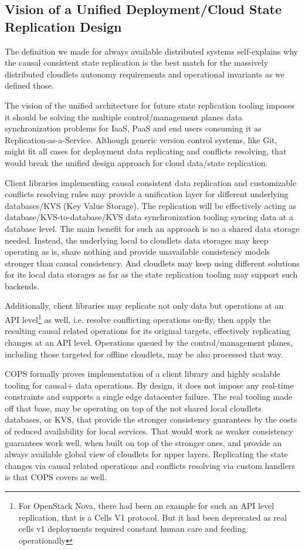 \documentclass[conference]{IEEEtran}
\begin{document}
\subsection{Vision of a Unified Deployment/Cloud State Replication Design}

The definition we made for always available distributed systems self-explains
why the causal consistent state replication is the best match for the
massively distributed cloudlets autonomy requirements and operational
invariants as we defined those.

The vision of the unified architecture for future state replication tooling
imposes it should be solving the multiple control/management planes data
synchronization problems for IaaS, PaaS and end users consuming it as
Replication-as-a-Service. Although generic version control systems, like Git,
might fit all cases for deployment data replicating and conflicts resolving,
that would break the unified design approach for cloud data/state replication.

Client libraries implementing causal consistent data replication and
customizable conflicts resolving rules may provide a unification layer for
different underlying databases/KVS (Key Value Storage). The replication will be
effectively acting as database/KVS-to-database/KVS data synchronization tooling
syncing data at a database level. The main benefit for such an approach is no a
shared data storage needed. Instead, the underlying local to cloudlets data
storages may keep operating as is, share nothing and provide unavailable
consistency models stronger than causal consistency. And cloudlets may keep
using different solutions for its local data storages as far as the state
replication tooling may support such backends.

Additionally, client libraries may replicate not only data but operations at an
API level\footnote{For OpenStack Nova, there had been an example for such an
API level replication, that is a Cells V1 protocol. But it had been deprecated
as real cells v1 deployments required constant human care and feeding
operationally} as well, i.e. resolve conflicting operations on-fly, then apply
the resulting causal related operations for its original targets, effectively
replicating changes at an API level. Operations queued by the
control/management planes, including those targeted for offline cloudlets, may
be also processed that way.

COPS formally proves implementation of a client library and highly scalable
tooling for causal+ data operations. By design, it does not impose any
real-time constraints and supports a single edge datacenter failure. The real
tooling made off that base, may be operating on top of the not shared local
cloudlets databases, or KVS, that provide the stronger consistency guarantees
by the costs of reduced availability for local services. That would work as
weaker consistency guarantees work well, when built on top of the stronger
ones, and provide an always available global view of cloudlets for upper
layers. Replicating the state changes via causal related operations and
conflicts resolving via custom handlers is that COPS covers as well.
\end{document}
